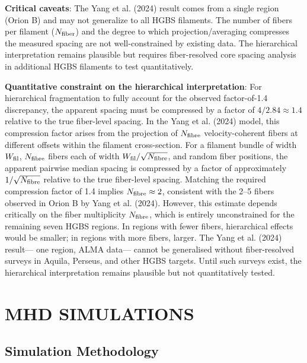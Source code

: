 \documentclass[twocolumn]{mnras}
\begin{document}
\textbf{Critical caveats}: The Yang et al. (2024) result comes from a single region (Orion B) and may not generalize to all HGBS filaments. The number of fibers per filament ($N_{\rm fiber}$) and the degree to which projection/averaging compresses the measured spacing are not well-constrained by existing data. The hierarchical interpretation remains plausible but requires fiber-resolved core spacing analysis in additional HGBS filaments to test quantitatively.

\textbf{Quantitative constraint on the hierarchical interpretation}: For hierarchical fragmentation to fully account for the observed factor-of-1.4 discrepancy, the apparent spacing must be compressed by a factor of $4/2.84 \approx 1.4$ relative to the true fiber-level spacing. In the Yang et al. (2024) model, this compression factor arises from the projection of $N_{\rm fibre}$ velocity-coherent fibers at different offsets within the filament cross-section. For a filament bundle of width $W_{\rm fil}$, $N_{\rm fibre}$ fibers each of width $W_{\rm fil}/\sqrt{N_{\rm fibre}}$, and random fiber positions, the apparent pairwise median spacing is compressed by a factor of approximately $1/\sqrt{N_{\rm fibre}}$ relative to the true fiber-level spacing. Matching the required compression factor of 1.4 implies $N_{\rm fibre} \approx 2$, consistent with the 2--5 fibers observed in Orion B by Yang et al. (2024). However, this estimate depends critically on the fiber multiplicity $N_{\rm fibre}$, which is entirely unconstrained for the remaining seven HGBS regions. In regions with fewer fibers, hierarchical effects would be smaller; in regions with more fibers, larger. The Yang et al. (2024) result— one region, ALMA data— cannot be generalised without fiber-resolved surveys in Aquila, Perseus, and other HGBS targets. Until such surveys exist, the hierarchical interpretation remains plausible but not quantitatively tested.

\section{MHD SIMULATIONS}

\subsection{Simulation Methodology}
\label{sec:methodology}
\end{document}
